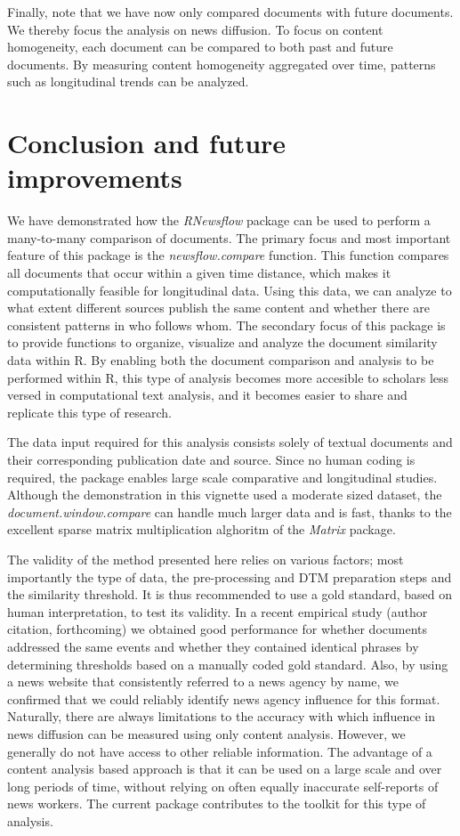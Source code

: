 Finally, note that we have now only compared documents with future
documents. We thereby focus the analysis on news diffusion. To focus on
content homogeneity, each document can be compared to both past and
future documents. By measuring content homogeneity aggregated over time,
patterns such as longitudinal trends can be analyzed.

\section{Conclusion and future improvements}

We have demonstrated how the \emph{RNewsflow} package can be used to
perform a many-to-many comparison of documents. The primary focus and
most important feature of this package is the \emph{newsflow.compare}
function. This function compares all documents that occur within a given
time distance, which makes it computationally feasible for longitudinal
data. Using this data, we can analyze to what extent different sources
publish the same content and whether there are consistent patterns in
who follows whom. The secondary focus of this package is to provide
functions to organize, visualize and analyze the document similarity
data within R. By enabling both the document comparison and analysis to
be performed within R, this type of analysis becomes more accesible to
scholars less versed in computational text analysis, and it becomes
easier to share and replicate this type of research.

The data input required for this analysis consists solely of textual
documents and their corresponding publication date and source. Since no
human coding is required, the package enables large scale comparative
and longitudinal studies. Although the demonstration in this vignette
used a moderate sized dataset, the \emph{document.window.compare} can
handle much larger data and is fast, thanks to the excellent sparse
matrix multiplication alghoritm of the \emph{Matrix} package.

The validity of the method presented here relies on various factors;
most importantly the type of data, the pre-processing and DTM
preparation steps and the similarity threshold. It is thus recommended
to use a gold standard, based on human interpretation, to test its
validity. In a recent empirical study (author citation, forthcoming) we
obtained good performance for whether documents addressed the same
events and whether they contained identical phrases by determining
thresholds based on a manually coded gold standard. Also, by using a
news website that consistently referred to a news agency by name, we
confirmed that we could reliably identify news agency influence for this
format. Naturally, there are always limitations to the accuracy with
which influence in news diffusion can be measured using only content
analysis. However, we generally do not have access to other reliable
information. The advantage of a content analysis based approach is that
it can be used on a large scale and over long periods of time, without
relying on often equally inaccurate self-reports of news workers. The
current package contributes to the toolkit for this type of analysis.

